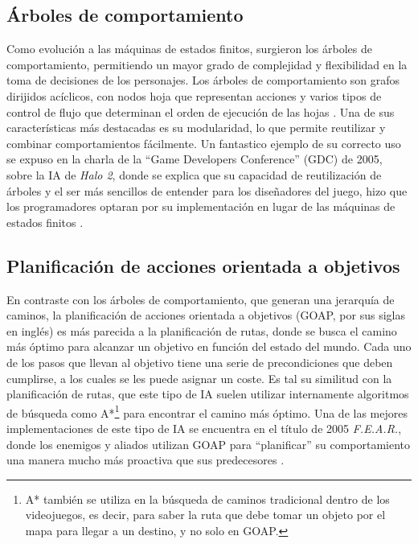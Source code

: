 \subsection{Árboles de comportamiento}

Como evolución a las máquinas de estados finitos, surgieron los árboles de comportamiento, permitiendo un mayor grado de complejidad y flexibilidad en la toma de decisiones de los personajes. Los árboles de comportamiento son grafos dirijidos acíclicos, con nodos hoja que representan acciones y varios tipos de control de flujo que determinan el orden de ejecución de las hojas \cite{epic_games_behavior_2025}. Una de sus características más destacadas es su modularidad, lo que permite reutilizar y combinar comportamientos fácilmente. Un fantastico ejemplo de su correcto uso se expuso en la charla de la ``Game Developers Conference'' (GDC) de 2005, sobre la IA de \textit{Halo 2}, donde se explica que su capacidad de reutilización de árboles y el ser más sencillos de entender para los diseñadores del juego, hizo que los programadores optaran por su implementación en lugar de las máquinas de estados finitos \cite{isla_managing_2005}.


\subsection{Planificación de acciones orientada a objetivos}

En contraste con los árboles de comportamiento, que generan una jerarquía de caminos, la planificación de acciones orientada a objetivos (GOAP, por sus siglas en inglés) es más parecida a la planificación de rutas, donde se busca el camino más óptimo para alcanzar un objetivo en función del estado del mundo. Cada uno de los pasos que llevan al objetivo tiene una serie de precondiciones que deben cumplirse, a los cuales se les puede asignar un coste. Es tal su similitud con la planificación de rutas, que este tipo de IA suelen utilizar internamente algoritmos de búsqueda como A*\footnote{A* también se utiliza en la búsqueda de caminos tradicional dentro de los videojuegos, es decir, para saber la ruta que debe tomar un objeto por el mapa para llegar a un destino, y no solo en GOAP.} para encontrar el camino más óptimo. Una de las mejores implementaciones de este tipo de IA se encuentra en el título de 2005 \textit{F.E.A.R.}, donde los enemigos y aliados utilizan GOAP para ``planificar'' su comportamiento una manera mucho más proactiva que sus predecesores \cite{jeff_gdc_2006}.



